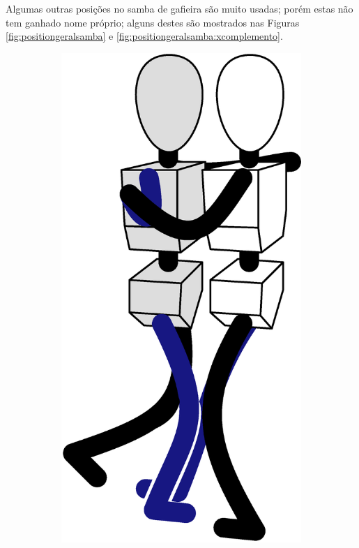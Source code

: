 Algumas outras posições no samba de gafieira são muito usadas;
porém estas não tem ganhado nome próprio;
alguns destes  são mostrados nas
Figuras \ref{fig:positiongeralsamba} e \ref{fig:positiongeralsamba:xcomplemento}.
\begin{figure}[!ht]
     \centering
     \begin{subfigure}[b]{0.2175\textwidth}
         \centering
         \includegraphics[width=\textwidth]{chapters/cap-normas/position-ffa.eps}

\end{subfigure}
\end{figure}
